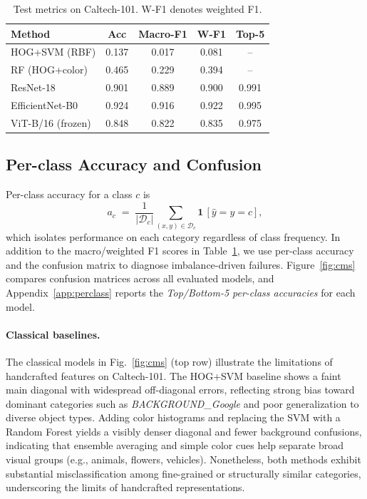 \documentclass[11pt]{article}
\newcommand{\accEffb}{0.924}\newcommand{\macroEffb}{0.916}\newcommand{\wFOneEffb}{0.922}\newcommand{\topFiveEffb}{0.995}
\newcommand{\accRes}{0.901}\newcommand{\macroRes}{0.889}\newcommand{\wFOneRes}{0.900}\newcommand{\topFiveRes}{0.991}
\newcommand{\accViT}{0.848}\newcommand{\macroViT}{0.822}\newcommand{\wFOneViT}{0.835}\newcommand{\topFiveViT}{0.975}
\newcommand{\accHOG}{0.137}\newcommand{\macroHOG}{0.017}\newcommand{\wFOneHOG}{0.081}
\newcommand{\accRF}{0.465}\newcommand{\macroRF}{0.229}\newcommand{\wFOneRF}{0.394}
\begin{document}
\begin{table}[h]
  \centering
  \begin{tabular}{lcccc}
    \toprule
    Method & Acc & Macro-F1 & W-F1 & Top-5 \\
    \midrule
    HOG+SVM (RBF) & \accHOG & \macroHOG & \wFOneHOG & -- \\
    {RF (HOG+color)} & \accRF & \macroRF & \wFOneRF & -- \\
    ResNet-18 & \accRes & \macroRes & \wFOneRes & \topFiveRes \\
    EfficientNet-B0 & \accEffb & \macroEffb & \wFOneEffb & \topFiveEffb \\
    ViT-B/16 (frozen) & \accViT & \macroViT & \wFOneViT & \topFiveViT \\
    \bottomrule
  \end{tabular}
  \caption{Test metrics on Caltech-101. W-F1 denotes weighted F1.}
  \label{tab:overall}
\end{table}

\subsection{Per-class Accuracy and Confusion}
Per-class accuracy for a class $c$ is
\[
a_c \;=\; \frac{1}{|\mathcal{D}_c|}\sum_{(x,y)\in\mathcal{D}_c} \mathbf{1}\,[\hat{y}=y=c],
\]
which isolates performance on each category regardless of class frequency. In addition to the macro/weighted
F1 scores in Table~\ref{tab:overall}, we use per-class accuracy and the confusion matrix to diagnose
imbalance-driven failures. Figure~\ref{fig:cms} compares confusion matrices across all evaluated models,
and Appendix~\ref{app:perclass} reports the \emph{Top/Bottom-5 per-class accuracies} for each model.

\paragraph{Classical baselines.}
The classical models in Fig.~\ref{fig:cms} (top row) illustrate the limitations of handcrafted features on Caltech-101.
The HOG+SVM baseline shows a faint main diagonal with widespread off-diagonal errors, reflecting strong bias toward
dominant categories such as \emph{BACKGROUND\_Google} and poor generalization to diverse object types.
Adding color histograms and replacing the SVM with a Random Forest yields a visibly denser diagonal and fewer
background confusions, indicating that ensemble averaging and simple color cues help separate broad visual groups
(e.g., animals, flowers, vehicles). Nonetheless, both methods exhibit substantial misclassification among
fine-grained or structurally similar categories, underscoring the limits of handcrafted representations.
\end{document}
